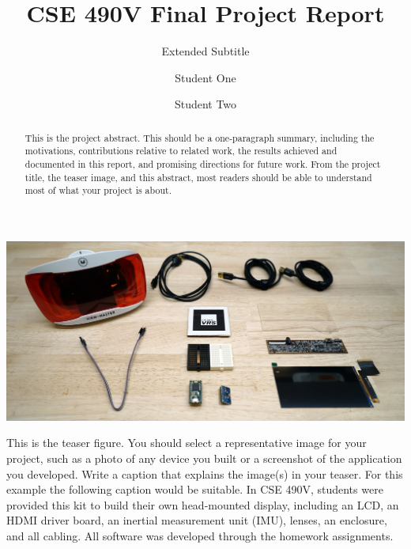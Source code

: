 \documentclass[acmtog,nonacm]{acmart}
\begin{document}
\title{CSE 490V Final Project Report}
\subtitle{Extended Subtitle}

\author{Student One}
\author{Student Two}

\begin{abstract}
This is the project abstract. This should be a one-paragraph summary, including the motivations, contributions relative to related work, the results achieved and documented in this report, and promising directions for future work. From the project title, the teaser image, and this abstract, most readers should be able to understand most of what your project is about.
\end{abstract}


\begin{teaserfigure}
  \includegraphics[width=\textwidth]{figures/teaser.jpg}
  \caption{This is the teaser figure. You should select a representative image for your project, such as a photo of any device you built or a screenshot of the application you developed. Write a caption that explains the image(s) in your teaser. For this example the following caption would be suitable. In CSE 490V, students were provided this kit to build their own head-mounted display, including an LCD, an HDMI driver board, an inertial measurement unit (IMU), lenses, an enclosure, and all cabling. All software was developed through the homework assignments.}
  \vspace{1em}
  \label{fig:teaser}
\end{teaserfigure}
\end{document}
